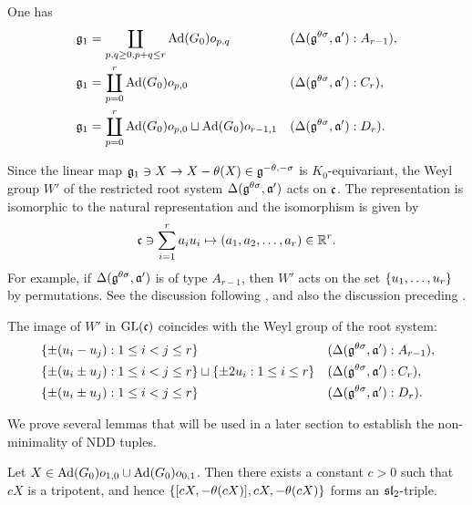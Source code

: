 \begin{fact} \label{fact:JordanOrbitDecomposition}
	One has
	\begin{align*}
		\mathfrak{g}_1 &= \coprod_{p, q \geq 0, p+q \leq r} \mathrm{Ad}(G_0)o_{p, q} && (\Delta(\mathfrak{g}^{\theta\sigma}, \mathfrak{a'}): A_{r-1}), \\
		\mathfrak{g}_1 &= \coprod_{p=0}^r \mathrm{Ad}(G_0)o_{p, 0} && (\Delta(\mathfrak{g}^{\theta\sigma}, \mathfrak{a'}): C_r), \\
		\mathfrak{g}_1 &= \coprod_{p=0}^r \mathrm{Ad}(G_0)o_{p, 0} \sqcup \mathrm{Ad}(G_0)o_{r-1, 1} && (\Delta(\mathfrak{g}^{\theta\sigma}, \mathfrak{a'}): D_r).
	\end{align*}
\end{fact}

Since the linear map $\mathfrak{g}_1 \ni X\rightarrow X - \theta(X) \in \mathfrak{g}^{-\theta, -\sigma}$ is $K_0$-equivariant, the Weyl group $W'$ of the restricted root system $\Delta(\mathfrak{g}^{\theta\sigma}, \mathfrak{a'})$ acts on $\mathfrak{c}$.
The representation is isomorphic to the natural representation and the isomorphism is given by
\begin{align*}
	\mathfrak{c} \ni \sum_{i=1}^r a_i u_i \mapsto (a_1, a_2, \ldots, a_r) \in \mathbb{R}^r.
\end{align*}
For example, if $\Delta(\mathfrak{g}^{\theta\sigma}, \mathfrak{a'})$ is of type $A_{r-1}$, then $W'$ acts on the set $\left\{u_1, \ldots, u_r \right\}$ by permutations.
See the discussion following \cite[Lemma 3.2]{Ka98}, and also the discussion preceding \cite[Part II, Lemma II.2.2]{FaKa00_jordan}.

\begin{fact} \label{fact:WeylGroupJordan}
	The image of $W'$ in $\mathrm{GL}(\mathfrak{c})$ coincides with the Weyl group of the root system:
	\begin{align*}
		&\left\{\pm (u_i - u_j) : 1\leq i < j \leq r \right\} && (\Delta(\mathfrak{g}^{\theta\sigma}, \mathfrak{a'}): A_{r-1}), \\
		&\left\{\pm (u_i \pm u_j) : 1\leq i < j \leq r \right\} \sqcup \left\{\pm 2u_i: 1\leq i \leq r \right\} && (\Delta(\mathfrak{g}^{\theta\sigma}, \mathfrak{a'}): C_r), \\
		&\left\{\pm (u_i \pm u_j) : 1\leq i < j \leq r \right\} && (\Delta(\mathfrak{g}^{\theta\sigma}, \mathfrak{a'}): D_{r}).
	\end{align*}
\end{fact}

We prove several lemmas that will be used in a later section to establish the non-minimality of NDD tuples.

\begin{lemma} \label{lem:RankOneTripotent}
	Let $X \in \mathrm{Ad}(G_0)o_{1, 0} \cup \mathrm{Ad}(G_0)o_{0, 1}$.
	Then there exists a constant $c > 0$ such that $cX$ is a tripotent, and hence $\left\{[cX, -\theta(cX)], cX, -\theta(cX) \right\}$ forms an $\mathfrak{sl}_2$-triple.
\end{lemma}

